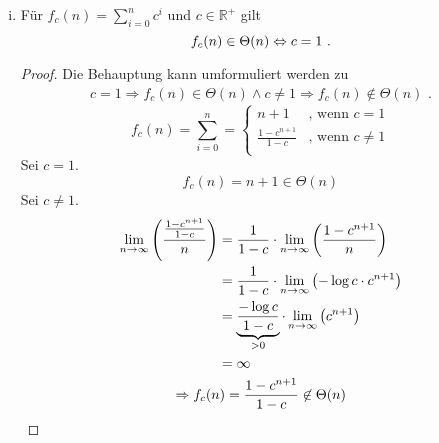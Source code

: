 \documentclass[a4paper]{scrartcl}
\begin{document}
\begin{enumerate}[(a)]
\begin{enumerate}[(i)]
                \item
                    \begin{behaupt}
                        Für $f_c(n) = \sum_{i=0}^n c^i$ und $c \in \mathbb{R}^+$ gilt
                        \begin{equation}
                            f_c(n) \in \Theta(n) \Leftrightarrow c = 1 \text{ .}
                        \end{equation}
                    \end{behaupt}
                    \begin{proof}
                        Die Behauptung kann umformuliert werden zu
                        \begin{gather}
                            c = 1 \Rightarrow f_c(n) \in \Theta(n)
                            \land
                            c \neq 1 \Rightarrow f_c(n) \not\in \Theta(n)
                            \text{ .}
                        \end{gather}
                        \begin{equation}
                            f_c(n) = \sum_{i=0}^{n}
                            =
                            \begin{cases}
                                n + 1 & \text{, wenn } c = 1 \\
                                \frac{1-c^{n+1}}{1-c} & \text{, wenn } c \neq 1 \\
                            \end{cases}
                        \end{equation}
                        Sei $c = 1$.
                        \begin{equation}
                            f_c(n) = n + 1 \in \Theta(n)
                        \end{equation}
                        Sei $c \neq 1$.
                        \begin{equation}
                            \begin{gathered}
                                \begin{split}
                                \lim_{n \to \infty} \left( \frac{\frac{1 - c^{n+1}}{1 - c}}{n} \right)
                                &= \frac{1}{1-c} \cdot \lim_{n \to \infty} \left( \frac{1-c^{n+1}}{n} \right) \\
                                &= \frac{1}{1-c} \cdot \lim_{n \to \infty} \left( -\log c \cdot c^{n+1} \right) \\
                                &= \underbrace{\frac{-\log c}{1-c}}_{> 0} \cdot \lim_{n \to \infty} \left( c^{n+1} \right) \\
                                &= \infty
                                \end{split} \\
                                \Rightarrow f_c(n) = \frac{1 - c^{n+1}}{1 - c} \not\in\Theta(n)
                            \end{gathered}
                        \end{equation}
                        

\end{proof}
\end{enumerate}
\end{enumerate}
\end{document}
